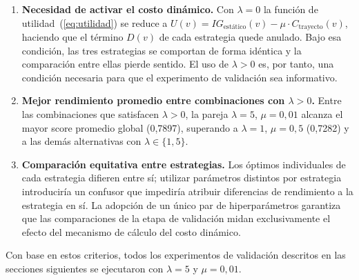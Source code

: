 \begin{enumerate}
    \item \textbf{Necesidad de activar el costo dinámico.} Con $\lambda=0$ la función de utilidad~(\ref{eq:utilidad}) se reduce a $U(v) = IG_{\text{estático}}(v) - \mu \cdot C_{\text{trayecto}}(v)$, haciendo que el término $D(v)$ de cada estrategia quede anulado. Bajo esa condición, las tres estrategias se comportan de forma idéntica y la comparación entre ellas pierde sentido. El uso de $\lambda>0$ es, por tanto, una condición necesaria para que el experimento de validación sea informativo.

    \item \textbf{Mejor rendimiento promedio entre combinaciones con $\lambda>0$.} Entre las combinaciones que satisfacen $\lambda>0$, la pareja $\lambda=5$, $\mu=0{,}01$ alcanza el mayor score promedio global (0,7897), superando a $\lambda=1$, $\mu=0{,}5$ (0,7282) y a las demás alternativas con $\lambda\in\{1,5\}$.

    \item \textbf{Comparación equitativa entre estrategias.} Los óptimos individuales de cada estrategia difieren entre sí; utilizar parámetros distintos por estrategia introduciría un confusor que impediría atribuir diferencias de rendimiento a la estrategia en sí. La adopción de un único par de hiperparámetros garantiza que las comparaciones de la etapa de validación midan exclusivamente el efecto del mecanismo de cálculo del costo dinámico.
\end{enumerate}

Con base en estos criterios, todos los experimentos de validación descritos en las secciones siguientes se ejecutaron con $\lambda=5$ y $\mu=0{,}01$.
